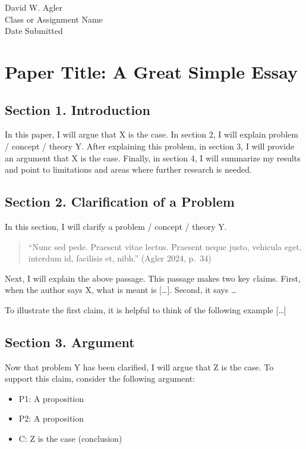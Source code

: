 David W. Agler\\
Class or Assignment Name\\
Date Submitted

\section{Paper Title: A Great Simple
Essay}\label{paper-title-a-great-simple-essay}

\subsection{Section 1. Introduction}\label{section-1.-introduction}

In this paper, I will argue that X is the case. In section 2, I will
explain problem / concept / theory Y. After explaining this problem, in
section 3, I will provide an argument that X is the case. Finally, in
section 4, I will summarize my results and point to limitations and
areas where further research is needed.

\subsection{Section 2. Clarification of a
Problem}\label{section-2.-clarification-of-a-problem}

In this section, I will clarify a problem / concept / theory Y.

\begin{quote}
``Nunc sed pede. Praesent vitae lectus. Praesent neque justo, vehicula
eget, interdum id, facilisis et, nibh.'' (Agler 2024, p.~34)
\end{quote}

Next, I will explain the above passage. This passage makes two key
claims. First, when the author says X, what is meant is {[}\ldots{]}.
Second, it says \ldots{}

To illustrate the first claim, it is helpful to think of the following
example {[}\ldots{]}

\subsection{Section 3. Argument}\label{section-3.-argument}

Now that problem Y has been clarified, I will argue that Z is the case.
To support this claim, consider the following argument:

\begin{itemize}
\tightlist
\item
  P1: A proposition
\item
  P2: A proposition
\item
  C: Z is the case (conclusion)
\end{itemize}

